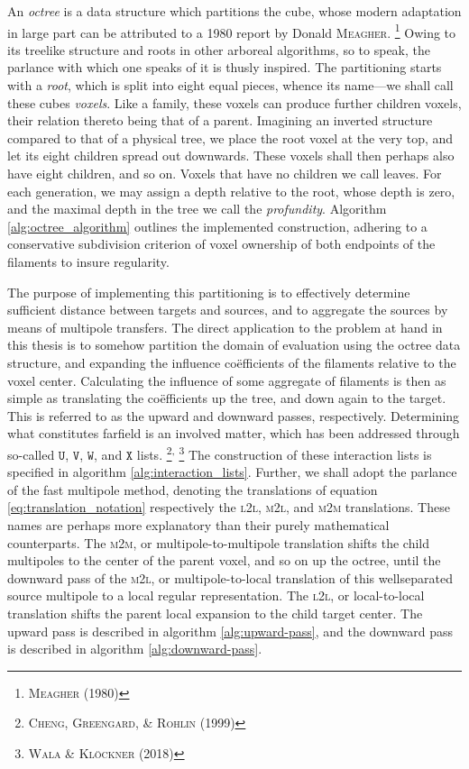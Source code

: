 An \emph{octree} is a data structure which partitions the cube, whose modern adaptation in large part can be attributed to a 1980 report by Donald \textsc{Meagher}.%
\footnote{%
  \cite{meagher1980octree} \textsc{Meagher} (1980)
}
Owing to its treelike structure and roots in other arboreal algorithms, so to speak, the parlance with which one speaks of it is thusly inspired.
The partitioning starts with a \emph{root}, which is split into eight equal pieces, whence its name---we shall call these cubes \emph{voxels}.
Like a family, these voxels can produce further children voxels, their relation thereto being that of a parent.
Imagining an inverted structure compared to that of a physical tree, we place the root voxel at the very top, and let its eight children spread out downwards.
These voxels shall then perhaps also have eight children, and so on.
Voxels that have no children we call leaves.
For each generation, we may assign a depth relative to the root, whose depth is zero, and the maximal depth in the tree we call the \emph{profundity}.
Algorithm \ref{alg:octree_algorithm} outlines the implemented construction, adhering to a conservative subdivision criterion of voxel ownership of both endpoints of the filaments to insure regularity.

The purpose of implementing this partitioning is to effectively determine sufficient distance between targets and sources, and to aggregate the sources by means of multipole transfers.
The direct application to the problem at hand in this thesis is to somehow partition the domain of evaluation using the octree data structure, and expanding the influence coëfficients of the filaments relative to the voxel center.
Calculating the influence of some aggregate of filaments is then as simple as translating the coëfficients up the tree, and down again to the target.
This is referred to as the upward and downward passes, respectively.
Determining what constitutes farfield is an involved matter, which has been addressed through so-called $\mathtt{U}$, $\mathtt{V}$, $\mathtt{W}$, and $\mathtt{X}$ lists.%
\footnote{%
  \cite{cheng1999fast} \textsc{Cheng}, \textsc{Greengard}, \& \textsc{Rohlin} (1999)
}\textsuperscript{,}%
\footnote{%
  \cite{wala2018fast} \textsc{Wala} \& \textsc{Klöckner} (2018)
}
The construction of these interaction lists is specified in algorithm \ref{alg:interaction_lists}.
Further, we shall adopt the parlance of the fast multipole method, denoting the translations of equation \eqref{eq:translation_notation} respectively the \textsc{l2l}, \textsc{m2l}, and \textsc{m2m} translations.
These names are perhaps more explanatory than their purely mathematical counterparts.
The \textsc{m2m}, or multipole-to-multipole translation shifts the child multipoles to the center of the parent voxel, and so on up the octree, until the downward pass of the \textsc{m2l}, or multipole-to-local translation of this wellseparated source multipole to a local regular representation.
The \textsc{l2l}, or local-to-local translation shifts the parent local expansion to the child target center.
The upward pass is described in algorithm \ref{alg:upward-pass}, and the downward pass is described in algorithm \ref{alg:downward-pass}.
